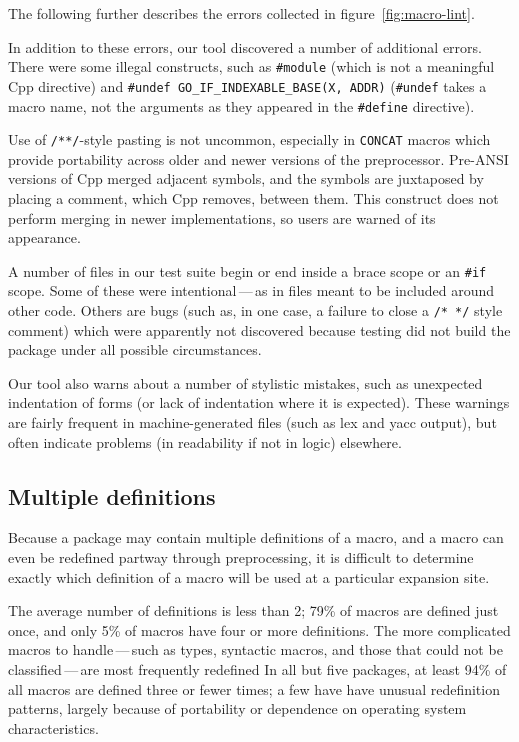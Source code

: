 \documentclass[10pt]{article}
\begin{document}
The following further describes the errors collected in
figure~\ref{fig:macro-lint}.

{}

In addition to these errors, our tool discovered a number of additional
errors.  There were some illegal constructs, such as {\tt \#module} (which
is not a meaningful Cpp directive) and {\tt \#undef
\verb|GO_IF_INDEXABLE_BASE|(X, ADDR)} ({\tt \#undef} takes a macro name,
not the arguments as they appeared in the {\tt \#define} directive).
  
Use of {\tt /**/}-style pasting is not uncommon, especially in {\tt CONCAT}
macros which provide portability across older and newer versions of the
preprocessor.  Pre-ANSI versions of Cpp merged adjacent symbols, and the
symbols are juxtaposed by placing a comment, which Cpp removes, between
them.  This construct does not perform merging in newer implementations,
so users are warned of its appearance.

A number of files in our test suite begin or end inside a brace scope or an
{\tt \#if} scope.  Some of these were intentional\,---\,as in files meant
to be included around other code.  Others are bugs (such as, in one case, a
failure to close a {\tt /* */} style comment) which were apparently not
discovered because testing did not build the package under all possible
circumstances.

Our tool also warns about a number of stylistic mistakes, such as
unexpected indentation of forms (or lack of indentation where it is
expected).  These warnings are fairly frequent in machine-generated files
(such as lex and yacc output), but often indicate problems (in readability
if not in logic) elsewhere.


\subsection{Multiple definitions}
\label{sec:mult-def}

Because a package may contain multiple definitions of a macro, and a macro
can even be redefined partway through preprocessing, it is difficult to
determine exactly which definition of a macro will be used at a particular
expansion site.

The average number of definitions is less than 2; 79\% of macros are
defined just once, and only 5\% of macros have four or more definitions.
The more complicated macros to handle\,---\,such as types, syntactic
macros, and those that could not be classified\,---\,are most frequently
redefined In all but five packages, at least 94\% of all macros are defined
three or fewer times; a few have have unusual redefinition patterns,
largely because of portability or dependence on operating system
characteristics.
\end{document}

